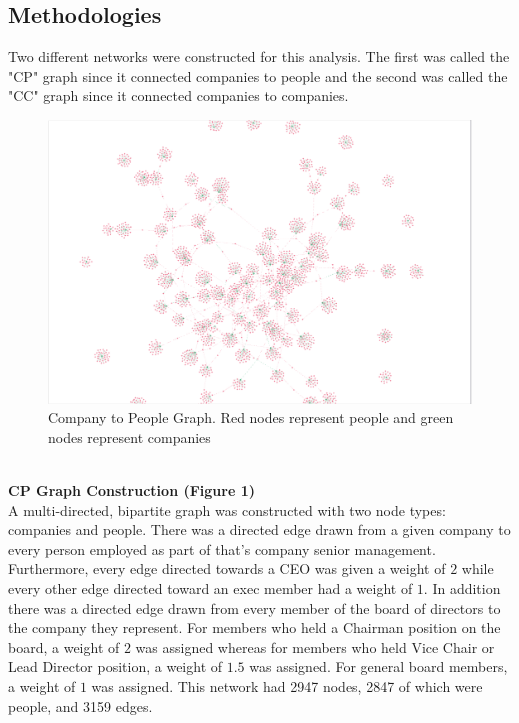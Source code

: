 \documentclass[a4paper]{article}
\begin{document}
    \subsection*{Methodologies}
    Two different networks were constructed for this analysis. The first was called the "CP" graph since it connected companies to people and the second was called the "CC" graph since it connected companies to companies.\\
    \begin{figure}[h]
        \centering
        \includegraphics[width=.6\linewidth]{./graphs/CP_by_type.png}
        \caption{Company to People Graph. Red nodes represent people and green nodes represent companies}
    \end{figure}\\
    \textbf{CP Graph Construction (Figure 1)}\\
    A multi-directed, bipartite graph was constructed with two node types: companies and people. There was a directed edge drawn from a given company to every person employed as part of that's company senior management. Furthermore, every edge directed towards a CEO was given a weight of $2$ while every other edge directed toward an exec member had a weight of $1$. In addition there was a directed edge drawn from every member of the board of directors to the company they represent. For members who held a Chairman position on the board, a weight of $2$ was assigned whereas for members who held Vice Chair or Lead Director position, a weight of $1.5$ was assigned. For general board members, a weight of $1$ was assigned. This network had 2947 nodes, 2847 of which were people, and 3159 edges.\\
\end{document}
